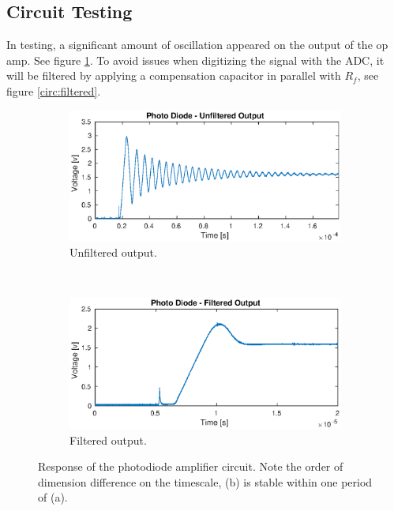 \subsection{Circuit Testing}
In testing, a significant amount of oscillation appeared on the output of the op amp. See figure \ref{fig:oscillation}. To avoid issues when digitizing the signal with the ADC, it will be filtered by applying a compensation capacitor in parallel with $R_f$, see figure \ref{circ:filtered}.

\begin{figure}[h!]
	\centering
	\begin{subfigure}{\linewidth}
		\includegraphics[width=\linewidth]{images/unfiltered}
		\caption{Unfiltered output.}
		\label{fig:oscillation}
	\end{subfigure}\\
	\begin{subfigure}{\linewidth}
		\includegraphics[width=\linewidth]{images/filtered}
		\caption{Filtered output.}
		\label{fig:nooscillation}
	\end{subfigure}
	\caption{Response of the photodiode amplifier circuit. Note the order of dimension difference on the timescale, (b) is stable within one period of (a).}
	\label{fig:photoresponse}
\end{figure}


